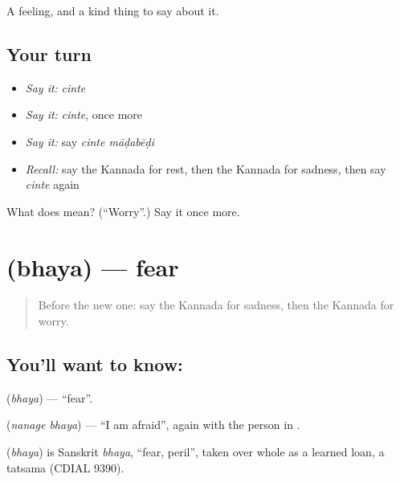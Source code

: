 \begin{grammarlens}[title={What you've built}]
A feeling, and a kind thing to say about it.
\end{grammarlens}

\subsection*{Your turn}
\begin{itemize}
\raggedright
  \item \emph{Say it:} \emph{cinte}
  \item \emph{Say it:} \emph{cinte}, once more
  \item \emph{Say it:} say \emph{cinte māḍabēḍi}
  \item \emph{Recall:} say the Kannada for rest, then the Kannada for sadness, then say \emph{cinte} again
\end{itemize}

\begin{tcolorbox}[breakable,colback=teal!4,colframe=teal!35!black,title={Before you move on}]
What does  mean? (\textquotedblleft{}Worry\textquotedblright{}.) Say it once more.
\end{tcolorbox}
\section[\texorpdfstring{\kn{ಭಯ} (bhaya)}{ಭಯ (bhaya)}]{ (bhaya) — fear}

\label{lesson:KA-C83-fear}



\begin{quote}
Before the new one: say the Kannada for sadness, then the Kannada for worry.
\end{quote}

\subsection*{You'll want to know: }
\textbf{} (\emph{bhaya}) — \textquotedblleft{}fear\textquotedblright{}.

\textbf{ } (\emph{nanage bhaya}) — \textquotedblleft{}I am afraid\textquotedblright{}, again with the person in \textbf{}.

\begin{cousinweb}
\textbf{} (\emph{bhaya}) is Sanskrit \emph{bhaya}, \textquotedblleft{}fear, peril\textquotedblright{}, taken over whole as a learned loan, a tatsama (CDIAL 9390).
\end{cousinweb}

